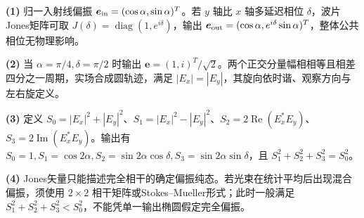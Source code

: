 \par\noindent\textbf{(1)} 归一入射线偏振 \(\boldsymbol e_{\rm in}=(\cos\alpha,\sin\alpha)^T\)。若 \(y\) 轴比 \(x\) 轴多延迟相位 \(\delta\)，波片 Jones矩阵可取 \(J(\delta)=\operatorname{diag}(1,e^{i\delta})\)，输出 \(\boldsymbol e_{\rm out}=(\cos\alpha,e^{i\delta}\sin\alpha)^T\)，整体公共相位无物理影响。
\par\noindent\textbf{(2)} 当 \(\alpha=\pi/4,\delta=\pi/2\) 时输出 \(\boldsymbol e=(1,i)^T/\sqrt2\)。两个正交分量幅相相等且相差四分之一周期，实场合成圆轨迹，满足 \(|E_x|=|E_y|\)，其旋向依时谐、观察方向与左右旋定义。
\par\noindent\textbf{(3)} 定义 \(S_0=|E_x|^2+|E_y|^2\)、\(S_1=|E_x|^2-|E_y|^2\)、\(S_2=2\operatorname{Re}(E_x^*E_y)\)、\(S_3=2\operatorname{Im}(E_x^*E_y)\)。输出有 \(S_0=1,S_1=\cos2\alpha,S_2=\sin2\alpha\cos\delta,S_3=\sin2\alpha\sin\delta\)，且 \(S_1^2+S_2^2+S_3^2=S_0^2\)。
\par\noindent\textbf{(4)} Jones矢量只能描述完全相干的确定偏振纯态。若光束在统计平均后出现混合偏振，须使用 \(2\times2\) 相干矩阵或Stokes–Mueller形式；此时一般满足 \(S_1^2+S_2^2+S_3^2<S_0^2\)，不能凭单一输出椭圆假定完全偏振。
